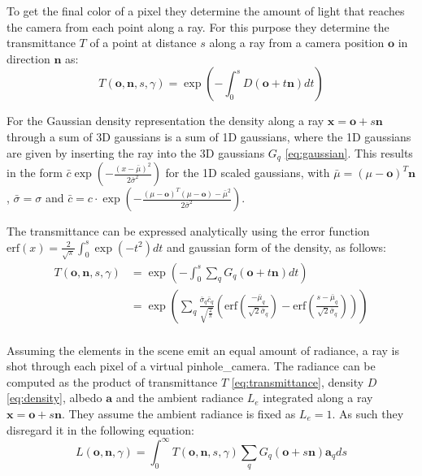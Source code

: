 \documentclass[a4paper, 11pt]{memoir}
\newcommand*{\erf}{\text{erf}}
\begin{document}
    To get the final color of a pixel they determine the amount of light that reaches the camera from each point
    along a ray. For this purpose they determine the \gls{transmittance} $T$ of a point at distance $s$ along a ray from
    a camera position $\mathbf{o}$ in direction $\mathbf{n}$ as:
    \begin{equation}
        T(\mathbf{o}, \mathbf{n}, s, \gamma) = \exp{\left( - \int_0^s D(\mathbf{o} + t\mathbf{n}) dt \right)}
        \label{eq:transmittance}
    \end{equation}

    For the Gaussian density representation the density along a ray $\mathbf{x} = \mathbf{o} + s\mathbf{n}$ through a
    sum of 3D gaussians is a sum of 1D gaussians, where the 1D gaussians are given by inserting the ray into the
    3D gaussians $G_q$ \eqref{eq:gaussian}. This results in the form
    $\bar{c} \exp{\left( - \frac{(x - \bar{\mu})^2}{2\bar{\sigma}^2} \right)}$ for the 1D scaled gaussians, with
    $\bar{\mu} = (\mu - \mathbf{o})^T\mathbf{n}$, $\bar{\sigma} = \sigma$ and
    $\bar{c} = c \cdot \exp{\left( - \frac{(\mu - \mathbf{o})^T(\mu - \mathbf{o}) - \bar{\mu}^2}{2\bar{\sigma}^2} \right)}$.

    The \gls{transmittance} can be expressed analytically using the error function
    $\erf{(x)} = \frac{2}{\sqrt{\pi}}\int_0^s \exp{(-t^2)} dt$ and gaussian form of the density, as follows:
    \begin{equation}
        \begin{aligned}
            T(\mathbf{o}, \mathbf{n}, s, \gamma) &= \exp{\left( -\int_0^s
                \sum_q G_q(\mathbf{o} + t\mathbf{n} ) dt \right)}\\
            &= \exp{\left( \sum_q \frac{\bar{\sigma}_q \bar{c}_q}{\sqrt{\frac{2}{\pi}}}
            \left( \erf{\left( \frac{-\bar{\mu}_q}{\sqrt{2}\bar{\sigma}_q} \right)}
            - \erf{\left( \frac{s - \bar{\mu}_q}{\sqrt{2}\bar{\sigma}_q} \right)} \right) \right)}\\
        \end{aligned}
        \label{eq:transmittance_analytical}
    \end{equation}

    Assuming the elements in the scene emit an equal amount of \gls{radiance}, a ray is shot through each pixel of a virtual
    \gls{pinhole_camera}. The \gls{radiance} can be computed as the product of \gls{transmittance} $T$ \eqref{eq:transmittance},
    density $D$ \eqref{eq:density}, \gls{albedo} $\mathbf{a}$ and the ambient \gls{radiance} $L_e$ integrated along a ray
    $\mathbf{x} = \mathbf{o} + s\mathbf{n}$. They assume the ambient \gls{radiance} is fixed as $L_e = 1$. As such they
    disregard it in the following equation:
    \begin{equation}
        L(\mathbf{o}, \mathbf{n}, \gamma) = \int_0^\infty T(\mathbf{o}, \mathbf{n}, s, \gamma)
            \sum_q G_q(\mathbf{o} + s\mathbf{n})\mathbf{a}_q ds
    \end{equation}
    
\end{document}

